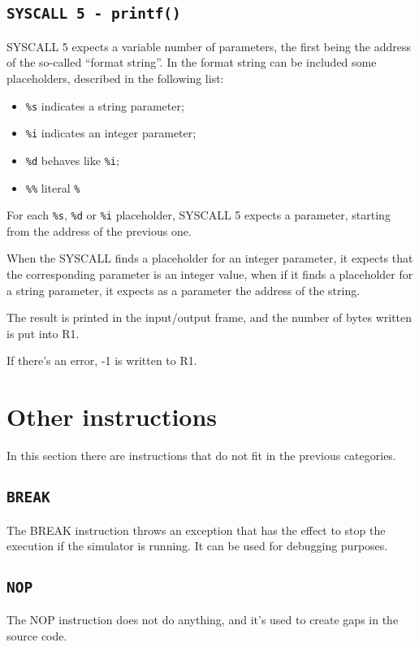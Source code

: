 \documentclass[12pt]{report}
\begin{document}
\subsection{\texttt{SYSCALL 5 - printf()}}
SYSCALL 5 expects a variable number of parameters, the first being the address
of the so-called ``format string''. In the format string can be included some
placeholders, described in the following list:
\begin{itemize}
	\item \texttt{\%s} indicates a string parameter;
	\item \texttt{\%i} indicates an integer parameter;
	\item \texttt{\%d} behaves like \texttt{\%i};
	\item \texttt{\%\%} literal \texttt{\%}
\end{itemize}

For each \texttt{\%s}, \texttt{\%d} or \texttt{\%i} placeholder, SYSCALL 5
expects a parameter, starting from the address of the previous one.

When the SYSCALL finds a placeholder for an integer parameter, it expects that
the corresponding parameter is an integer value, when if it finds a placeholder
for a string parameter, it expects as a parameter the address of the string.

The result is printed in the input/output frame, and the number of bytes
written is put into R1.

If there's an error, -1 is written to R1.

\section{Other instructions}
In this section there are instructions that do not fit in the previous 
categories.
\subsection{\texttt{BREAK}}
The BREAK instruction throws an exception that has the effect to stop the
execution if the simulator is running. It can be used for debugging purposes.

\subsection{\texttt{NOP}}
The NOP instruction does not do anything, and it's used to create gaps in the
source code.
\end{document}
